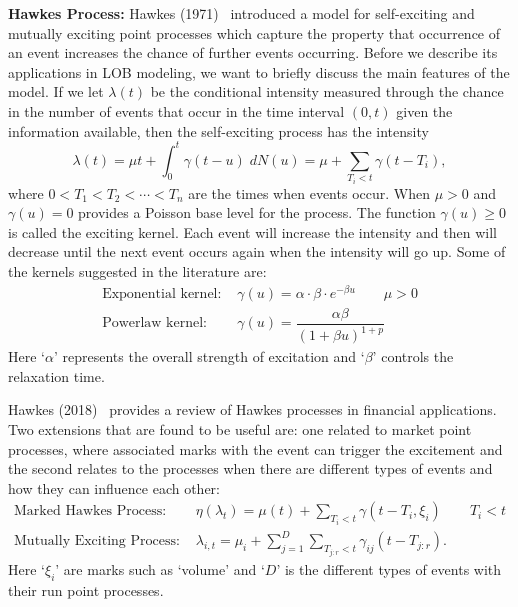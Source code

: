 \noindent\textbf{Hawkes Process:} Hawkes (1971)~\cite{hawkes71} introduced a model for self-exciting and mutually exciting point processes which capture the property that occurrence of an event increases the chance of further events occurring. Before we describe its applications in LOB modeling, we want to briefly discuss the main features of the model. If we let $\lambda(t)$ be the conditional intensity measured through the chance in the number of events that occur in the time interval $(0,t)$ given the information available, then the self-exciting process has the intensity
	\begin{equation} \label{eq:seintensity}
	\lambda(t)= \mu t+ \int_0^t \gamma(t-u) \;dN(u)= \mu + \sum_{T_i<t} \gamma(t-T_i),
	\end{equation}
where $0<T_1<T_2<\cdots<T_n$ are the times when events occur. When $\mu>0$ and $\gamma(u)=0$ provides a Poisson base level for the process. The function $\gamma(u) \geq 0$ is called the exciting kernel. Each event will increase the intensity and then will decrease until the next event occurs again when the intensity will go up. Some of the kernels suggested in the literature are:
	\begin{equation} \label{eq:suggex}
	\begin{split}
	\text{Exponential kernel: }& \gamma(u)= \alpha \cdot \beta \cdot e^{-\beta u} \quad\quad \mu>0 \\
	\text{Powerlaw kernel: }& \gamma(u)= \dfrac{\alpha \beta}{(1+\beta u)^{1+p}}
	\end{split}
	\end{equation}
Here `$\alpha$' represents the overall strength of excitation and `$\beta$' controls the relaxation time. 


Hawkes (2018)~\cite{hawkes18} provides a review of Hawkes processes in financial applications. Two extensions that are found to be useful are: one related to market point processes, where associated marks with the event can trigger the excitement and the second relates to the processes when there are different types of events and how they can influence each other:
	\begin{equation} \label{eq:markedhawk}
	\begin{split}
	\text{Marked Hawkes Process: }& \eta(\lambda_t)= \mu(t) + \sum_{T_i<t} \gamma(t-T_i, \xi_i) \quad \quad T_i<t \\
	\text{Mutually Exciting Process: }& \lambda_{i,t}= \mu_i + \sum_{j=1}^D \sum_{T_{j:r}<t} \gamma_{ij} (t- T_{j:r}).
	\end{split}
	\end{equation}
Here `$\xi_i$' are marks such as `volume' and `$D$' is the different types of events with their run point processes. 










